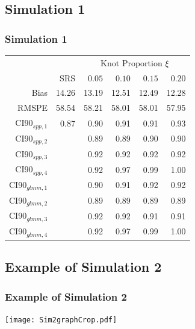 \documentclass[mathserif,compress]{beamer}
\begin{document}
\subsection{Simulation 1}
\begin{frame}
\frametitle{Simulation 1}

\begin{table}[ht]
\begin{center}
\begin{tabular}{rrrrrr}
	\hline
	&  & \multicolumn{4}{c}{Knot Proportion $\xi$} \\ 
	& SRS & $0.05$ & $0.10$ & $0.15$ & $0.20$ \\ 
	\hline
	Bias & 14.26 & 13.19 & 12.51 & 12.49 & 12.28 \\ 
  RMSPE & 58.54 & 58.21 & 58.01 & 58.01 & 57.95 \\ 
  CI90$_{spp,1}$ & 0.87 & 0.90 & 0.91 & 0.91 & 0.93 \\ 
  CI90$_{spp,2}$ &  & 0.89 & 0.89 & 0.90 & 0.90 \\ 
  CI90$_{spp,3}$ &  & 0.92 & 0.92 & 0.92 & 0.92 \\ 
  CI90$_{spp,4}$ &  & 0.92 & 0.97 & 0.99 & 1.00 \\ 
  CI90$_{glmm,1}$ &  & 0.90 & 0.91 & 0.92 & 0.92 \\ 
  CI90$_{glmm,2}$ &  & 0.89 & 0.89 & 0.89 & 0.89 \\ 
  CI90$_{glmm,3}$ &  & 0.92 & 0.92 & 0.91 & 0.91 \\ 
  CI90$_{glmm,4}$ &  & 0.92 & 0.97 & 0.99 & 1.00 \\ 
   \hline
\end{tabular}
\end{center}
\end{table}

\end{frame}


\subsection{Example of Simulation 2}
\begin{frame}
\frametitle{Example of Simulation 2}

	\begin{center} 
		\texttt{[image: Sim2graphCrop.pdf]} 
	\end{center}

\end{frame}
\end{document}
